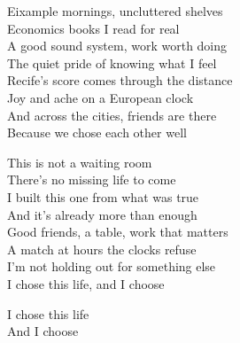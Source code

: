 \begin{lyrics}
Eixample mornings, uncluttered shelves\\
Economics books I read for real\\
A good sound system, work worth doing\\
The quiet pride of knowing what I feel\\
Recife's score comes through the distance\\
Joy and ache on a European clock\\
And across the cities, friends are there\\
Because we chose each other well

This is not a waiting room\\
There's no missing life to come\\
I built this one from what was true\\
And it's already more than enough\\
Good friends, a table, work that matters\\
A match at hours the clocks refuse\\
I'm not holding out for something else\\
I chose this life, and I choose

I chose this life\\
And I choose
\end{lyrics}

